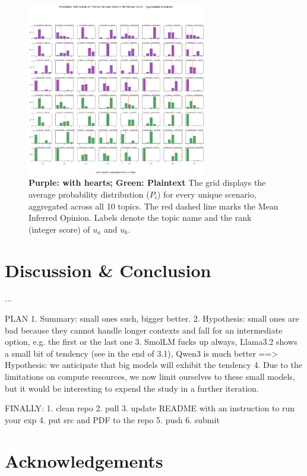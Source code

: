 \documentclass[11pt]{article}
\begin{document}
\begin{figure}[t] %
    \centering
    \includegraphics[width=0.7\textwidth]{plots/qwen_log_prob.png}
    \caption{\textbf{Purple: with hearts; Green: Plaintext}
    The grid displays the average probability distribution ($P_i$) for every unique scenario, aggregated across all 10 topics. The red dashed line marks the Mean Inferred Opinion. Labels denote the topic name and the rank (integer score) of $u_a$ and $u_b$. }
    \label{fig:qwen-log-prob}
\end{figure}


\section{Discussion \& Conclusion}
...

PLAN
1. Summary: small ones such, bigger better. 
2. Hypothesis: small ones are bad because they cannot handle longer contexts and fall for an intermediate option, e.g. the first or the last one
3. SmolLM fucks up always, Llama3.2 shows a small bit of tendency (see in the end of 3.1), Qwen3 is much better ==> Hypothesis: we anticipate that big models will exhibit the tendency
4. Due to the limitations on compute resources, we now limit ourselves to these small models, but it would be interesting to expend the study in a further iteration. 

FINALLY:
1. clean repo
2. pull
3. update README with an instruction to run your exp
4. put src and PDF to the repo
5. push
6. submit



\section*{Acknowledgements}
\end{document}

